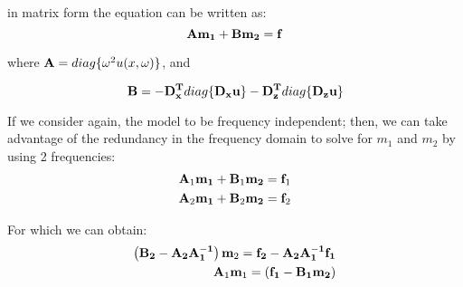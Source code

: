 \documentclass[10pt]{article}
\begin{document}
in matrix form the equation can be written as:
\begin{equation}
  {\bf A} {\bf m_1} + {\bf B} {\bf m_2} = {\bf f}
\end{equation}

where ${\bf A} = diag\{\omega^2 u(x,\omega)\}$, and 

\begin{equation}
 {\bf B} = -{\bf D_x^T}{ diag\{\bf D_x u\}} - {\bf D_z^T}{ diag\{\bf D_z u\}} 
\end{equation}

If we consider again, the model to be frequency independent; then, we can take advantage of the 
redundancy in the frequency domain to solve for $m_1$ and $m_2$ by using 2 frequencies:
\begin{align}
  {\bf A}_1 {\bf m_1} + {\bf B}_1 {\bf m_2} = {\bf f}_1 \\
  {\bf A}_2 {\bf m_1} + {\bf B}_2 {\bf m_2} = {\bf f}_2
\end{align}

For which we can obtain:
\begin{align}
  \left( {\bf B_2}-{\bf A_2}{\bf A_1^{-1}} \right) {\bf m}_2 = {\bf f_2} -{\bf A_2}{\bf A_1^{-1} f_1} \\
 {\bf A}_1 {\bf m}_1 = ({\bf f_1}-{\bf B_1 m_2}) 
\end{align}
\end{document}
